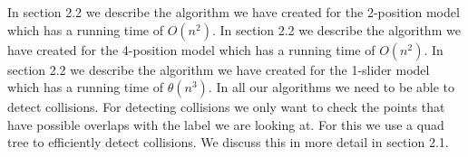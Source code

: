 \documentclass[crop=false,a4paper,oneside,11pt]{standalone}
\begin{document}
In section 2.2 we describe the algorithm we have created for the 2-position model which has a running time of $O(n^2)$. In section 2.2 we describe the algorithm we have created for the 4-position model which has a running time of $O(n^2)$. In section 2.2 we describe the algorithm we have created for the 1-slider model which has a running time of $\theta(n^3)$. In all our algorithms we need to be able to detect collisions. For detecting collisions we only want to check the points that have possible overlaps with the label we are looking at. For this we use a quad tree to efficiently detect collisions. We discuss this in more detail in section 2.1.
\end{document}
